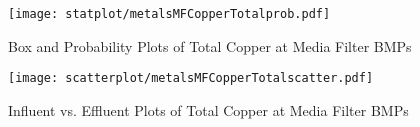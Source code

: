         \begin{figure}[hb]   %
            \centering
            \texttt{[image: statplot/metalsMFCopperTotalprob.pdf]}
            \caption{Box and Probability Plots of Total Copper at Media Filter BMPs}
        \end{figure}         %
        
        
        \begin{figure}[hb]   %
            \centering
            \texttt{[image: scatterplot/metalsMFCopperTotalscatter.pdf]}
            \caption{Influent vs. Effluent Plots of Total Copper at Media Filter BMPs}
        \end{figure}         %
        \clearpage
        